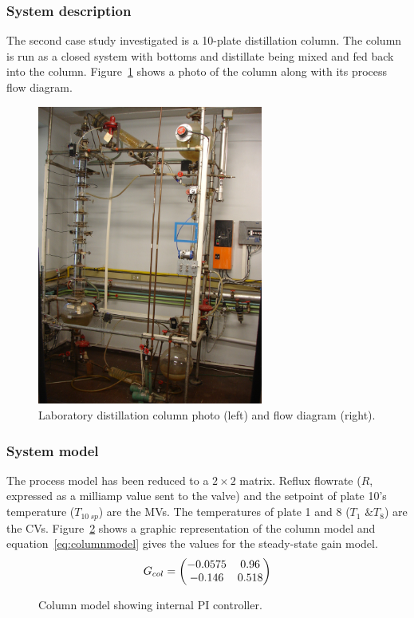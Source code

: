 \subsubsection{System description}
The second case study investigated is a 10-plate distillation column.
The column is run as a closed system with bottoms and distillate being mixed and fed back into the column.
Figure~\ref{fig:columnphoto} shows a photo of the column along with its process flow diagram.
\begin{figure}[htbp]
  \centering
    \includegraphics[width=7.4cm]{graph/columnphoto.jpg}
    \scalebox{1}{}  
  \caption[Laboratory distillation column photo and flow diagram]{Laboratory distillation column photo (left) and flow diagram (right).}
  \label{fig:columnphoto}
\end{figure}

\subsubsection{System model}
The process model has been reduced to a $2\times2$ matrix.
Reflux flowrate ($R$, expressed as a milliamp value sent to the valve) and the setpoint of plate 10's temperature ($T_{10~sp}$) are the MVs.
The temperatures of plate 1 and 8 ($T_1\text{ \& }T_{8}$) are the CVs.
Figure~\ref{fig:columnmodel} shows a graphic representation of the column model and equation~\ref{eq:columnmodel} gives the values for the steady-state gain model.
\begin{equation}
  \label{eq:columnmodel}
  G_{col} = \bpm -0.0575 & 0.96 \\       %
                -0.146  & 0.518 \\ \epm %
\end{equation}
\begin{figure}[htbp]
  \centering
    \scalebox{1}{}  
  \caption[Column model]{Column model showing internal PI controller.}
  \label{fig:columnmodel}
\end{figure}

